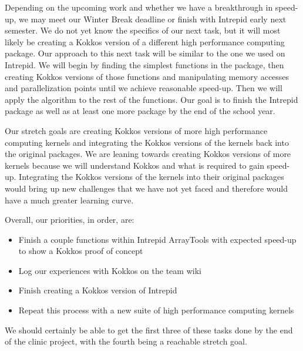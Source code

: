 \documentclass[midyear]{hmcclinic}
\begin{document}
Depending on the upcoming work and whether we have a breakthrough in speed-up,
we may meet our Winter Break deadline or finish with Intrepid early next semester. We do not yet
know the specifics of our next task, but it will most likely be
creating a Kokkos version of a different high performance computing package.
Our approach to this next task will be similar to the one we used on Intrepid. We will begin by
finding the simplest functions in the package, then creating Kokkos versions of
those functions and manipulating memory accesses and parallelization points until we
achieve reasonable speed-up. Then we will apply the algorithm to the rest of the
functions. Our goal is to finish the Intrepid package as well as at least one
more package by the end of the school year. 

Our stretch goals are creating Kokkos versions of more high
performance computing kernels and integrating the Kokkos versions of the kernels
back into the original packages. We are leaning towards creating
Kokkos versions of more kernels because we will understand
Kokkos and what is required to gain speed-up. Integrating the Kokkos versions
of the kernels into their original packages would bring up new challenges that we
have not yet faced and therefore would have a much greater learning curve. 

Overall, our priorities, in order, are: 
\begin{itemize}
	\item Finish a couple functions within Intrepid ArrayTools
	with expected speed-up to show a Kokkos proof of concept
	
	\item Log our experiences with Kokkos on the team wiki
	
	\item Finish creating a Kokkos version of Intrepid
	
	\item Repeat this process with a new suite of high performance
	computing kernels
\end{itemize}
We should certainly be able to get the first three of these tasks done
by the end of the clinic project, with the fourth being a reachable stretch goal.
\end{document}
